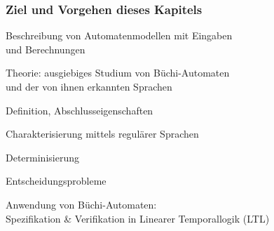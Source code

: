     \begin{frame}
      \frametitle{Ziel und Vorgehen dieses Kapitels}

      \par\smallskip
      Beschreibung von Automatenmodellen mit  Eingaben \\
      und  Berechnungen

      \par\bigskip\noindent
      \begin{Itemize}
        \item
          Theorie: ausgiebiges Studium von Büchi-Automaten\\
          und der von ihnen erkannten Sprachen
          \begin{Itemize}
            \item
              Definition, Abschlusseigenschaften
            \item
              Charakterisierung mittels regulärer Sprachen
            \item
              Determinisierung
            \item
              Entscheidungsprobleme
          \end{Itemize}
        \item
          Anwendung von Büchi-Automaten:\\
          Spezifikation \& Verifikation in Linearer Temporallogik (LTL)\\
      \end{Itemize}

    \end{frame}

